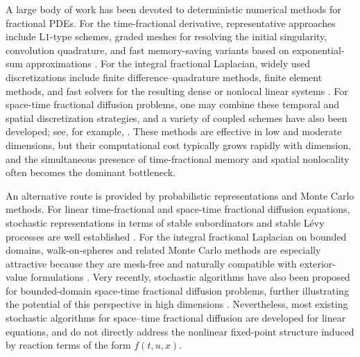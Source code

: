 \documentclass[a4paper,fleqn]{cas-sc}
\begin{document}
A large body of work has been devoted to deterministic numerical methods for fractional PDEs. For the time-fractional derivative, representative approaches include $\mathrm{L1}$-type schemes, graded meshes for resolving the initial singularity, convolution quadrature, and fast memory-saving variants based on exponential-sum approximations \cite{Lubich1986CQ,SchadleLopezFernandezLubich2006FastObliviousCQ,StynesORiordanGracia2017L1Graded,JinLazarovZhou2019Overview,jin2023numerical,jin2021fractional}. For the integral fractional Laplacian, widely used discretizations include finite difference--quadrature methods, finite element methods, and fast solvers for the resulting dense or nonlocal linear systems \cite{HuangOberman2014FDQuadratureFracLaplacian,AcostaBorthagaray2017FEMFracLap,MindenYing2020SimpleSolverFracLap,LischkePangEtal2020WhatFracLaplacian}. For space-time fractional diffusion problems, one may combine these temporal and spatial discretization strategies, and a variety of coupled schemes have also been developed; see, for example, \cite{YangTurnerLiuIlic2011TimeSpace}. These methods are effective in low and moderate dimensions, but their computational cost typically grows rapidly with dimension, and the simultaneous presence of time-fractional memory and spatial nonlocality often becomes the dominant bottleneck.

An alternative route is provided by probabilistic representations and Monte Carlo methods. For linear time-fractional and space-time fractional diffusion equations, stochastic representations in terms of stable subordinators and stable L\'evy processes are well established \cite{BaeumerMeerschaert2001StochasticCauchy,MeerschaertBensonSchefflerBaeumer2002StochasticSpaceTime,MeerschaertNaneVellaisamy2009BoundedCauchy,GorenfloMainardiEtAl2009Simulation}. For the integral fractional Laplacian on bounded domains, walk-on-spheres and related Monte Carlo methods are especially attractive because they are mesh-free and naturally compatible with exterior-value formulations \cite{KyprianouOsojnikShardlow2017UnbiasedWoS,Shardlow2019WalkOutsideSpheres,ShengSuXu2023EfficientMCIFL,LischkePangEtal2020WhatFracLaplacian}. Very recently, stochastic algorithms have also been proposed for bounded-domain space-time fractional diffusion problems, further illustrating the potential of this perspective in high dimensions \cite{CuiShengSuZhou2025StochasticST}. Nevertheless, most existing stochastic algorithms for space--time fractional diffusion are developed for linear equations, and do not
directly address the nonlinear fixed-point structure induced by reaction terms
of the form $f(t,u,x)$.
\end{document}
